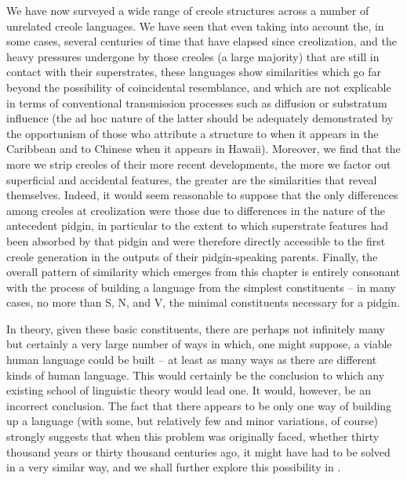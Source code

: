 We have now surveyed a wide range of creole structures across a number of unrelated creole languages. We have seen that even taking into account the, in some cases, several centuries of time that have elapsed since creolization, and the heavy pressures undergone by those creoles (a large majority) that are still in contact with their superstrates, these languages show similarities which go far beyond the possibility of coincidental resemblance, and which are not explicable in terms of conventional transmission processes such as diffusion or substratum influence (the ad hoc nature of the latter should be adequately demonstrated by the opportunism of those who attribute a structure to  when it appears in the Caribbean and to Chinese when it appears in Hawaii). Moreover, we find that the more we strip creoles of their more recent developments, the more we factor out superficial and accidental features, the greater are the similarities that reveal themselves. Indeed, it would seem reasonable to suppose that the only differences among creoles at creolization were those due to differences in the nature of the antecedent pidgin, in particular to the extent to which superstrate features had been absorbed by that pidgin and were therefore directly accessible to the first creole generation in the outputs of their pidgin-speaking parents. Finally, the overall pattern of similarity which emerges from this chapter is entirely consonant with the process of building a language from the simplest constituents -- in many cases, no more than S, N, and V, the minimal constituents necessary for a pidgin.


In theory, given these basic constituents, there are perhaps not infinitely many but certainly a very large number of ways in which, one might suppose, a viable human language could be built -- at least as many ways as there are different kinds of human language. This would certainly be the conclusion to which any existing school of linguistic theory would lead one. It would, however, be an incorrect conclusion. The fact that there appears to be only one way of building up a language (with some, but relatively few and minor variations, of course) strongly suggests that when this problem was originally faced, whether thirty thousand years or thirty thousand centuries ago, it might have had to be\enlargethispage{1\baselineskip} solved in a very similar way, and we shall further explore this possibility in .


